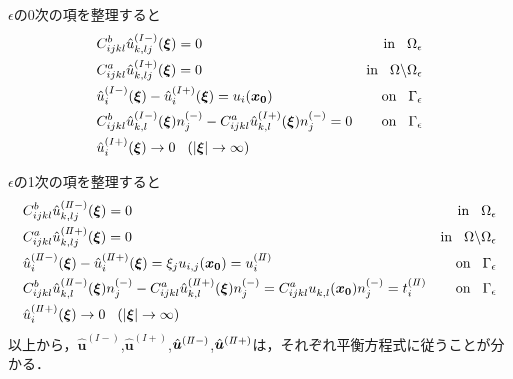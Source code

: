 $\epsilon$の0次の項を整理すると
\begin{align}
&C_{ijkl}^{b} \hat{u}^{(I-)}_{k,lj}(\bm{\xi})=0&\text{in}\hspace{0.3cm}\Omega_{\epsilon}
\label{eq:GovDisturIn1}
\\
&C_{ijkl}^{a} \hat{u}^{(I+)}_{k,lj}(\bm{\xi})=0&\text{in}\hspace{0.3cm}\Omega\backslash\Omega_{\epsilon}
\label{eq:GovDisturOut1}
\\
&\hat{u}_{i}^{(I-)}(\bm{\xi})-\hat{u}_{i}^{(I+)}(\bm{\xi})=u_{i}(\bm{x_0}) &\text{on}\hspace{0.3cm}\Gamma_{\epsilon}
\label{eq:GovDisturUBC1}
\\
&C_{ijkl}^{b}\hat{u}_{k,l}^{(I-)}(\bm{\xi})n_{j}^{(-)}
-C_{ijkl}^{a}\hat{u}_{k,l}^{(I+)}(\bm{\xi})n_{j}^{(-)}=0 &\text{on}\hspace{0.3cm}\Gamma_{\epsilon}
\label{eq:GovDisturSBC1}
\\
&\hat{u}_{i}^{(I+)}(\bm{\xi})\rightarrow 0 \hspace{0.3cm} (|\bm{\xi}|\rightarrow \infty)
\label{eq:GovDisturInftyBC1}
\end{align}

$\epsilon$の1次の項を整理すると
\begin{align}
&C_{ijkl}^{b} \hat{u}^{(I\hspace{-.15em}I-)}_{k,lj}(\bm{\xi})=0
&\text{in}\hspace{0.3cm}\Omega_{\epsilon}
\label{eq:GovDisturIn2}
\\
&C_{ijkl}^{a} \hat{u}^{(I\hspace{-.15em}I+)}_{k,lj}(\bm{\xi})=0
&\text{in}\hspace{0.3cm}\Omega\backslash\Omega_{\epsilon}
\label{eq:GovDisturOut2}
\\
&\hat{u}_{i}^{(I\hspace{-.15em}I-)}(\bm{\xi})
-\hat{u}_{i}^{(I\hspace{-.15em}I+)}(\bm{\xi})= \xi_j u_{i,j}(\bm{x_0})=u_{i}^{(I\hspace{-.15em}I)} &\text{on}\hspace{0.3cm}\Gamma_{\epsilon}
\label{eq:GovDisturUBC2}
\\
&C_{ijkl}^{b}\hat{u}_{k,l}^{(I\hspace{-.15em}I-)}(\bm{\xi})n_{j}^{(-)}
-C_{ijkl}^{a}\hat{u}_{k,l}^{(I\hspace{-.15em}I+)}(\bm{\xi})n_{j}^{(-)}
=C_{ijkl}^{a} u_{k,l}^{}(\bm{x_0})n_{j}^{(-)}=t_{i}^{(I\hspace{-.15em}I)} &\text{on}\hspace{0.3cm}\Gamma_{\epsilon}
\label{eq:GovDisturSBC2}
\\
&\hat{u}_{i}^{(I\hspace{-.15em}I+)}(\bm{\xi})\rightarrow 0 \hspace{0.3cm} (|\bm{\xi}|\rightarrow \infty)
\label{eq:GovDisturInftyBC2}
\end{align}
以上から，$\hat{\bm{u}}^{(I-)}$,$\hat{\bm{u}}^{(I+)}$,$\hat{\bm{u}}^{(I\hspace{-.15em}I-)}$,$\hat{\bm{u}}^{(I\hspace{-.15em}I+)}$は，それぞれ平衡方程式に従うことが分かる．

\newpage
